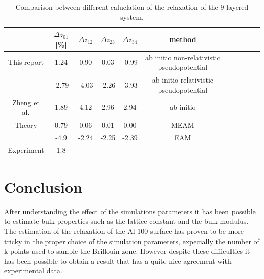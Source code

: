 \documentclass[a4paper, 11pt]{article}
\begin{document}
    \begin{table}[H]
      \centering
      \begin{tabular}{ccccccccccc}
        \toprule
        & $\Delta z_{01}$ [\%] & $\Delta z_{12}$ & $\Delta z_{23}$ & $\Delta z_{34}$ & method \\
        \midrule
        This report & 1.24 & 0.90 & 0.03 & -0.99 & ab initio non-relativistic pseudopotential \\
                    & -2.79 & -4.03 & -2.26 & -3.93 & ab initio relativistic pseudopotential \\
        \midrule
        Zheng et al. & 1.89 & 4.12 & 2.96 & 2.94 & ab initio \\
        Theory & 0.79 & 0.06 & 0.01 & 0.00 & MEAM \cite{rif:MEAM} \\
               & -4.9 & -2.24 & -2.25 & -2.39 & EAM \cite{rif:EAM} \\
        Experiment \cite{rif:experiment} & 1.8 & & & & \\
        \bottomrule
      \end{tabular}
      \caption{Comparison between different caluclation of the relaxation of the 9-layered system.}
      \label{tab:comparison}
    \end{table}


\section{Conclusion}
  After understanding the effect of the simulations parameters it has been possible to estimate bulk properties such as the lattice constant and the bulk modulus. The estimation of the relaxation of the Al 100 surface has proven to be more tricky in the proper choice of the simulation parameters, expecially the number of k points used to sample the Brillouin zone. However despite these difficulties it has been possible to obtain a result that has a quite nice agreement with experimental data.
\end{document}
